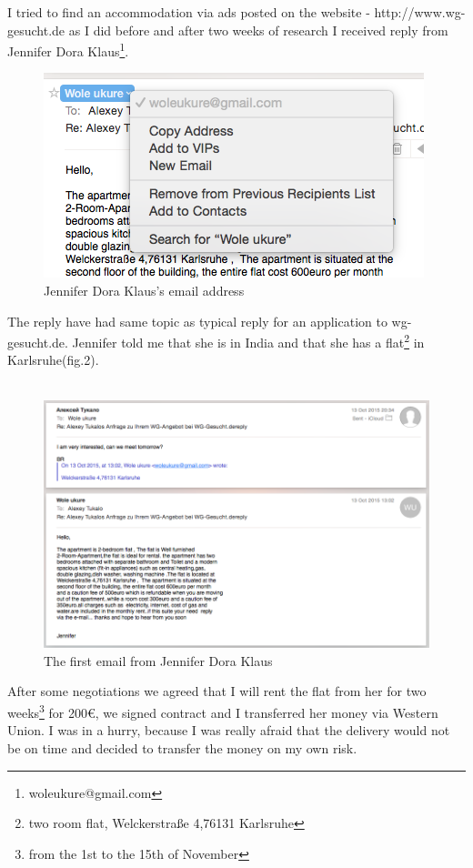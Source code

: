\documentclass[english]{article}
\begin{document}
I tried to find an accommodation via ads posted on the website - http://www.wg-gesucht.de as I did before and after two weeks of research I received reply from Jennifer Dora Klaus\footnote{woleukure@gmail.com}.
\begin{figure}[H]
\centerline{\includegraphics[scale=0.4]{st/1}}
\caption{Jennifer Dora Klaus's email address}
\end{figure}
 The reply have had same topic as typical reply for an application to wg-gesucht.de. Jennifer told me that she is in India and that she has a flat\footnote{two room flat, Welckerstraße 4,76131 Karlsruhe} in Karlsruhe(fig.2).\\\\
\begin{figure}[H]
\centerline{\includegraphics[scale=0.4]{st/2}}
\caption{The first email from Jennifer Dora Klaus}
\end{figure}

After some negotiations we agreed that I will rent the flat from her for two weeks\footnote{from the 1st to the 15th of November} for 200\euro, we signed contract and I transferred her money via Western Union. I was in a hurry, because I was really afraid that the delivery would not be on time and decided to transfer the money on my own risk. 
\end{document}

